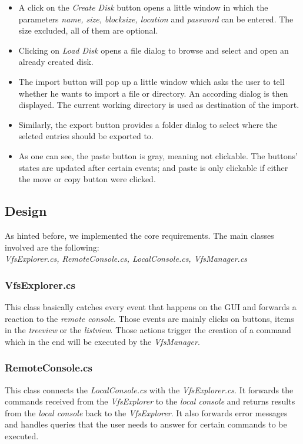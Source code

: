 \documentclass[a4paper,12pt]{article}
\begin{document}
\begin{itemize}
\item A click on the \emph{Create Disk} button opens a little window in which the parameters \emph{ name, size, blocksize, location} and \emph{password} can be entered. The size excluded, all of them are optional.
\item Clicking on \emph{Load Disk} opens a file dialog to browse and select and open an already created disk.
\item The import button will pop up a little window which asks the user to tell whether he wants to import a file or directory. An according dialog is then displayed. The current working directory is used as destination of the import.
\item Similarly, the export button provides a folder dialog to select where the selcted entries should be exported to.
\item As one can see, the paste button is gray, meaning not clickable. The buttons' states are updated after certain events; and paste is only clickable if either the move or copy button were clicked.
\end{itemize}


\subsection{Design}

As hinted before, we implemented the core requirements. The main classes involved are the following: \\
\emph{VfsExplorer.cs, RemoteConsole.cs, LocalConsole.cs, VfsManager.cs}
\subsubsection{VfsExplorer.cs}
This class basically catches every event that happens on the GUI and forwards a reaction to the \emph{remote console}. Those events are mainly clicks on buttons, items in the \emph{treeview} or the \emph{listview}. Those actions trigger the creation of a command which in the end will be executed by the \emph{VfsManager}.
\subsubsection{RemoteConsole.cs}
This class connects the \emph{LocalConsole.cs} with the \emph{VfsExplorer.cs}. It forwards the commands received from the \emph{VfsExplorer} to the \emph{local console} and returns results from the \emph{local console} back to the \emph{VfsExplorer}. It also forwards error messages and handles queries that the user needs to answer for certain commands to be executed.
\end{document}
